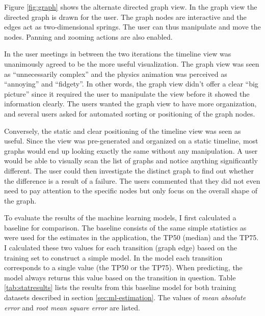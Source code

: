Figure \ref{fig:graph} shows the alternate directed graph view. In the graph view the directed graph is drawn for the user. The graph nodes are interactive and the edges act as two-dimensional springs.
The user can thus manipulate and move the nodes. Panning and zooming actions are also enabled.

In the user meetings in between the two iterations the timeline view was unanimously agreed to be the more useful visualization. 
The graph view was seen as ``unnecessarily complex'' and the physics animation was perceived as ``annoying'' and ``fidgety''. 
In other words, the graph view didn't offer a clear ``big picture'' since it required the user to manipulate the view before it showed the information clearly. 
The users wanted the graph view to have more organization, and several users asked for automated sorting or positioning of the graph nodes.

Conversely, the static and clear positioning of the timeline view was seen as useful.
Since the view was pre-generated and organized on a static timeline, most graphs would end up looking exactly the same without any manipulation.
A user would be able to visually scan the list of graphs and notice anything significantly different.
The user could then investigate the distinct graph to find out whether the difference is a result of a failure.
The users commented that they did not even need to pay attention to the specific nodes but only focus on the overall shape of the graph.

To evaluate the results of the machine learning models, I first calculated a baseline for comparison.
The baseline consists of the same simple statistics as were used for the estimates in the application, the TP50 (median) and the TP75.
I calculated these two values for each transition (graph edge) based on the training set to construct a simple model. 
In the model each transition corresponds to a single value (the TP50 or the TP75). 
When predicting, the model always returns this value based on the transition in question.
Table \ref{tab:statresults} lists the results from this baseline model for both training datasets described in section \ref{sec:ml-estimation}. 
The values of \textit{mean absolute error} and \textit{root mean square error} are listed.

